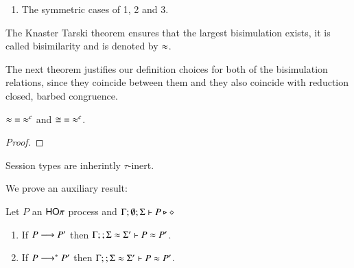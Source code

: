 \begin{definition}[Bisimulation]
\begin{enumerate}
		\item	The symmetric cases of 1, 2 and 3.
	\end{enumerate}
	The Knaster Tarski theorem ensures that the largest bisimulation exists, it is called bisimilarity and is denoted by $\approx$.
\end{definition}

The next theorem justifies our definition choices
for both of the bisimulation relations, since
they coincide between them and they also
coincide with reduction closed, barbed congruence.

\begin{theorem}[Coincidence]\rm
	$\approx\ =\ \approx^{c}$ and $\cong\ =\ \approx^{c}$.
\end{theorem}

\begin{proof}
\end{proof}


Session types are inherintly $\tau$-inert.


We prove an auxiliary result:

\begin{lemma}
	\label{lem:tau_inert}
	Let $P$ an $\mathsf{HO}\pi$ process
	and $\Gamma; \emptyset; \Sigma \vdash P \triangleright \diamond$
	\begin{enumerate}
		\item	If $P \longrightarrow P'$ then $\Gamma; \empty; \Sigma \wb \Sigma' \proves P \wb P'$.
		\item	If $P \longrightarrow^* P'$ then $\Gamma; \empty; \Sigma \wb \Sigma' \proves P \wb P'$.
	\end{enumerate}
\end{lemma}

